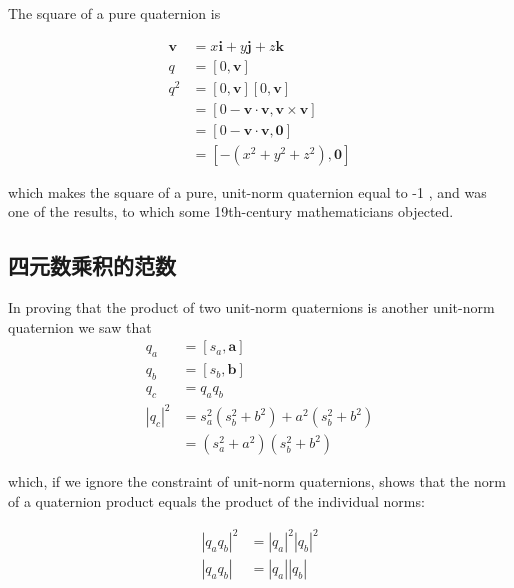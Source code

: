     The square of a pure quaternion is

    $$
        \begin{aligned}
            \mathbf{v} & =x \mathbf{i}+y \mathbf{j}+z \mathbf{k}                        \\
            q          & =[0, \mathbf{v}]                                               \\
            q^{2}      & =[0, \mathbf{v}][0, \mathbf{v}]                                \\
                       & =[0-\mathbf{v} \cdot \mathbf{v}, \mathbf{v} \times \mathbf{v}] \\
                       & =[0-\mathbf{v} \cdot \mathbf{v}, \mathbf{0}]                   \\
                       & =\left[-\left(x^{2}+y^{2}+z^{2}\right), \mathbf{0}\right]
        \end{aligned}
    $$

    which makes the square of a pure, unit-norm quaternion equal to -1 , and was one of the results, to which some 19th-century mathematicians objected.

    \subsection{四元数乘积的范数}
    In proving that the product of two unit-norm quaternions is another unit-norm quaternion we saw that
    $$
        \begin{aligned}
            q_{a}                  & =\left[s_{a}, \mathbf{a}\right]                                          \\
            q_{b}                  & =\left[s_{b}, \mathbf{b}\right]                                          \\
            q_{c}                  & =q_{a} q_{b}                                                             \\
            \left|q_{c}\right|^{2} & =s_{a}^{2}\left(s_{b}^{2}+b^{2}\right)+a^{2}\left(s_{b}^{2}+b^{2}\right) \\
                                   & =\left(s_{a}^{2}+a^{2}\right)\left(s_{b}^{2}+b^{2}\right)
        \end{aligned}
    $$

    which, if we ignore the constraint of unit-norm quaternions, shows that the norm of a quaternion product equals the product of the individual norms:

    $$
        \begin{aligned}
            \left|q_{a} q_{b}\right|^{2} & =\left|q_{a}\right|^{2}\left|q_{b}\right|^{2} \\
            \left|q_{a} q_{b}\right|     & =\left|q_{a}\right|\left|q_{b}\right|
        \end{aligned}
    $$

